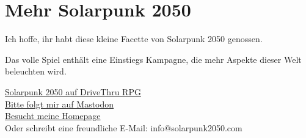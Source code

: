 \chapter{Mehr Solarpunk 2050}

Ich hoffe, ihr habt diese kleine Facette von Solarpunk 2050 genossen.

Das volle Spiel enthält eine Einstiegs Kampagne, die mehr Aspekte dieser Welt beleuchten wird.

\vspace{1cm}
\begin{center}
\href{https://www.drivethrurpg.com/product/443881/Solarpunk-2050?affiliate_id=490747}{Solarpunk 2050 auf DriveThru RPG} \\
\href{https://dice.camp/@solarpunk2050}{Bitte folgt mir auf Mastodon} \\
\href{https://solarpunk2050.com}{Besucht meine Homepage} \\
Oder schreibt eine freundliche E-Mail: info@solarpunk2050.com \\
\end{center}